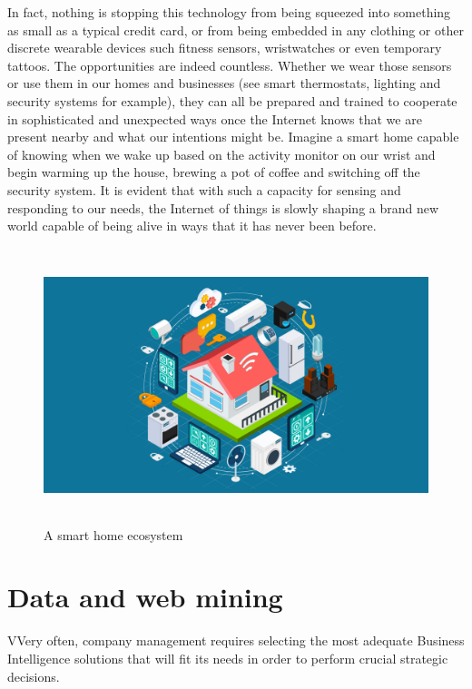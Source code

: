 In fact, nothing is stopping this technology from being squeezed into something as small as a typical credit card, or from being embedded in any clothing or other discrete wearable devices such fitness sensors, wristwatches or even temporary tattoos. The opportunities are indeed countless.
Whether we wear those sensors or use them in our homes and businesses (see smart thermostats, lighting and security systems for example), they can all be prepared and trained to cooperate in sophisticated and unexpected ways once the Internet knows that we are present nearby and what our intentions might be. Imagine a smart home capable of knowing when we wake up based on the activity monitor on our wrist and begin warming up the house, brewing a pot of coffee and switching off the security system. 
It is evident that with such a capacity for sensing and responding to our needs,  the Internet of things is slowly shaping a brand new world capable of being alive in ways that it has never been before.


\vspace{0.5cm}
\begin{figure}[htbp]
  \centering
    \includegraphics[height=8cm]{images/iot}
  \caption{A smart home ecosystem}
  \label{fig:iot}
\end{figure}
\vspace{0.5cm}

\section{Data and web mining}

VVery often, company management requires selecting the most adequate Business Intelligence solutions that will fit its needs in order to perform crucial strategic decisions.

